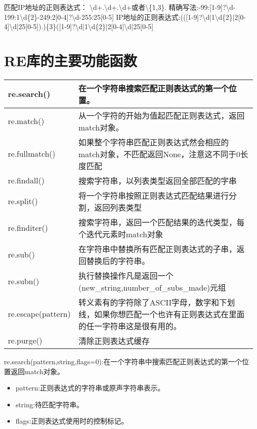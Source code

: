 \documentclass{book}
\begin{document}
匹配IP地址的正则表达式：
\textbackslash d+.\textbackslash d+.\textbackslash d+或者\textbackslash\{1,3\}.
精确写法:-99:[1-9]?\textbackslash d-199:1\textbackslash d\{2\}-249:2[0-4]?\textbackslash d-255:25[0-5]\newline
IP地址的正则表达式:(([1-9]?\textbackslash d|1\textbackslash d\{2\}|2[0-4]\textbackslash d|25[0-5]).)\{3\}([1-9]?\textbackslash d|1\textbackslash d\{2\}|2[0-4]\textbackslash d|25[0-5]
\section{RE库的主要功能函数}
\begin{center}
\begin{tabular}{|p{2cm}|p{8cm}|}
\hline
re.search()&在一个字符串搜索匹配正则表达式的第一个位置。\\
\hline
re.match()&从一个字符的开始为值起匹配正则表达式，返回match对象。\\
\hline
re.fullmatch()&如果整个字符串匹配正则表达式然会相应的match对象，不匹配返回None，注意这不同于0长度匹配\\
\hline
re.findall()&搜索字符串，以列表类型返回全部匹配的字串\\
\hline
re.split()&将一个字符串按照正则表达式匹配结果进行分割，返回列表类型\\
\hline
re.finditer()&搜索字符串，返回一个匹配结果的迭代类型，每个迭代元素时match对象\\
\hline
re.sub()&在字符串中替换所有匹配正则表达式的子串，返回替换后的字符串。\\
\hline
re.subn()&执行替换操作凡是返回一个(new\_string,number\_of\_subs\_made)元组\\
\hline
re.escape(pattern)&转义素有的字符除了ASCII字母，数字和下划线，如果你想匹配一个也许有正则表达式在里面的任一字符串这是很有用的。\\
\hline
re.purge()&清除正则表达式缓存\\
\hline
\end{tabular}
\end{center}
\newpage
re.search(pattern,string,flags=0):在一个字符串中搜索匹配正则表达式的第一个位置返回match对象。\newline
\begin{itemize}
\item pattern:正则表达式的字符串或原声字符串表示。
\item string:待匹配字符串。
\item flags:正则表达式使用时的控制标记。\newline
\end{itemize}
\end{document}
